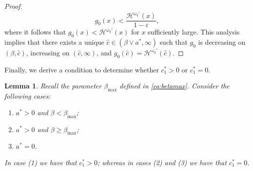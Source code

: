 \documentclass[11pt,reqno]{amsart}
\newtheorem{lemma}{Lemma}[section]
\newcommand{\cH}{\mathcal{H}}
\newcommand{\homega}{\omega_q}
\renewcommand{\geq}{\geqslant}
\begin{document}
\begin{proof}
	\[
	g_0(x) < \frac{\cH^{\homega\prime}(x)}{1-\varepsilon},
	\]
	where it follows that $g_0(x) < \cH^{\homega\prime}(x)$ for $x$ sufficiently large. This analysis implies that there exists a unique $\hat{c} \in (\beta \vee a^\ast,\infty)$ such that $g_0$ is decreasing on $(\beta,\hat{c})$, increasing on $(\hat{c},\infty)$, and $g_0(\hat{c}) = \cH^{\homega\prime}(\hat{c})$.
\end{proof}
Finally, we derive a condition to determine whether $c_1^\ast > 0 $ or $c_1^\ast=0$.
\begin{lemma}\label{lemma.condition}
	Recall the parameter $\beta_{\max}$ defined in \eqref{eq:betamax}. Consider the following cases:
	\begin{enumerate}
		\item $a^\ast > 0$ and $\beta < \beta_{\max}$;
		\item $a^\ast > 0$ and $\beta \geq \beta_{\max}$;
		\item $a^\ast = 0$.
	\end{enumerate}
	In case (1) we have that $c_1^\ast > 0$; whereas in cases (2) and (3) we have that $c_1^\ast=0$.
\end{lemma}
\end{document}
